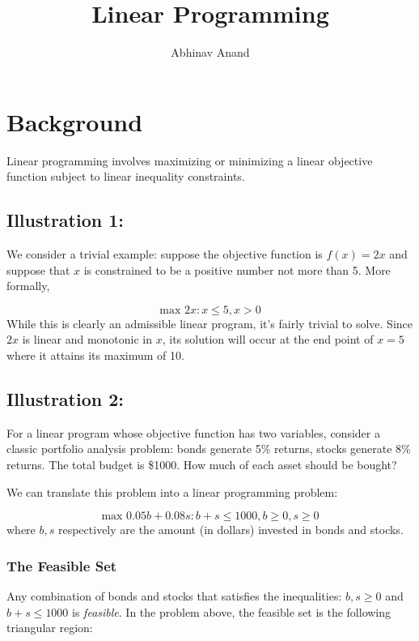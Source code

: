 \documentclass[11pt,]{article}
\title{Linear Programming}
\author{Abhinav Anand}
\date{}
\begin{document}
\maketitle

\section{Background}\label{background}

Linear programming involves maximizing or minimizing a linear objective
function subject to linear inequality constraints.

\subsection{Illustration 1:}\label{illustration-1}

We consider a trivial example: suppose the objective function is
\(f(x) = 2x\) and suppose that \(x\) is constrained to be a positive
number not more than 5. More formally,

\[
\text{max } 2x: x\leq 5, x>0
\] While this is clearly an admissible linear program, it's fairly
trivial to solve. Since \(2x\) is linear and monotonic in \(x\), its
solution will occur at the end point of \(x=5\) where it attains its
maximum of 10.

\subsection{Illustration 2:}\label{illustration-2}

For a linear program whose objective function has two variables,
consider a classic portfolio analysis problem: bonds generate 5\%
returns, stocks generate 8\% returns. The total budget is \$1000. How
much of each asset should be bought?

We can translate this problem into a linear programming problem:

\[
\text{max } 0.05b+0.08s: b+s\leq 1000, b \geq 0, s \geq 0
\] where \(b, s\) respectively are the amount (in dollars) invested in
bonds and stocks.

\subsubsection{The Feasible Set}\label{the-feasible-set}

Any combination of bonds and stocks that satisfies the inequalities:
\(b ,s \geq 0\) and \(b+s\leq 1000\) is \emph{feasible}. In the problem
above, the feasible set is the following triangular region:
\end{document}

